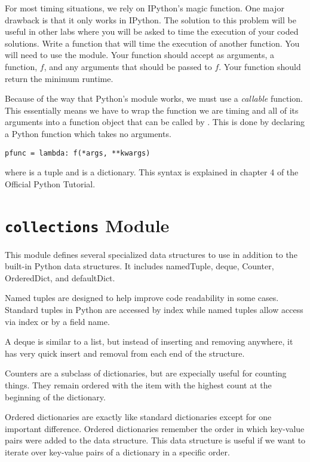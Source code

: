 \begin{problem}
For most timing situations, we rely on IPython's  magic function.
One major drawback is that it only works in IPython.
The solution to this problem will be useful in other labs where you will be asked to time the execution of your coded solutions.
Write a function that will time the execution of another function.
You will need to use the  module.
Your function should accept as arguments, a function, $f$, and any arguments that should be passed to $f$.
Your function should return the minimum runtime.

Because of the way that Python's  module works, we must use a \emph{callable} function.
This essentially means we have to wrap the function we are timing and all of its arguments into a function object that can be called by .
This is done by declaring a Python  function which takes no arguments.
\begin{lstlisting}
pfunc = lambda: f(*args, **kwargs)
\end{lstlisting}
where  is a tuple and  is a dictionary.
This syntax is explained in chapter 4 of the Official Python Tutorial.
\end{problem}

\section*{\texttt{collections} Module}
This module defines several specialized data structures to use in addition to the built-in Python data structures. It includes namedTuple, deque, Counter, OrderedDict, and defaultDict.

Named tuples are designed to help improve code readability in some cases.
Standard tuples in Python are accessed by index while named tuples allow access via index or by a field name.

A deque is similar to a list, but instead of inserting and removing anywhere, it has very quick insert and removal from each end of the structure.
 
Counters are a subclass of dictionaries, but are expecially useful for counting things. They remain ordered with the item with the highest count at the beginning of the dictionary.
 
Ordered dictionaries are exactly like standard dictionaries except for one important difference.
Ordered dictionaries remember the order in which key-value pairs were added to the data structure.
This data structure is useful if we want to iterate over key-value pairs of a dictionary in a specific order.

